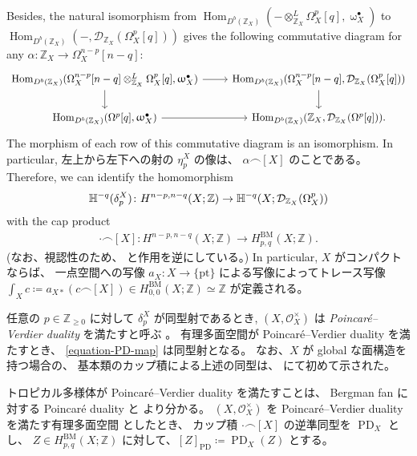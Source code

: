 \documentclass[a4paper,dvipdfmx,reqno,12pt]{amsart}
\theoremstyle{definition}
\newcommand{\deq}{\coloneqq}
\newcommand{\opn}[1]{\operatorname{#1}}
\newcommand{\PD}[1]{[#1]_{\mathrm{PD}}}
\numberwithin{equation}{section}
\begin{document}
Besides, the natural isomorphism from
$\opn{Hom}_{D^{b}(\mathbb{Z}_X)}(- 
\otimes^{L}_{\mathbb{Z}_X} \Omega_X^{p}[q],
\upomega_X^{\bullet})$ to 
$\opn{Hom}_{D^{b}(\mathbb{Z}_X)}(-,
\mathcal{D}_{\mathbb{Z}_X}(\Omega_X^{p}[q]))$
gives the following commutative diagram
for any $\alpha \colon \mathbb{Z}_X\to \Omega_X^{n-p}[n-q]$:
\[\begin{tikzcd}
{\opn{Hom}_{D^{b}(\mathbb{Z}_X)}(\Omega_X^{n-p}[n-q]
\otimes^{L}_{\mathbb{Z}_X} \Omega_X^{p}[q]
,\upomega_X^{\bullet})} & 
{\opn{Hom}_{D^{b}(\mathbb{Z}_X)}
(\Omega_X^{n-p}[n-q],\mathcal{D}_{\mathbb{Z}_X}(\Omega_X^{p}[q]))} \\
{\opn{Hom}_{D^{b}(\mathbb{Z}_X)}(\Omega^{p}[q],
\upomega_X^{\bullet})} & {\opn{Hom}_{D^{b}(\mathbb{Z}_X)}(\mathbb{Z}_X,\mathcal{D}_{\mathbb{Z}_X}(\Omega^{p}[q]))}.
	\arrow[from=1-2, to=2-2]
	\arrow[from=2-1, to=2-2]
	\arrow[from=1-1, to=1-2]
	\arrow[from=1-1, to=2-1]
\end{tikzcd}\]
The morphism of each row of
this commutative diagram is an isomorphism.
In particular,
左上から左下への射の $\eta^X_{p}$ の像は、
$\alpha\frown [X]$ のことである。
Therefore, we can identify
the homomorphism
\begin{align}
\mathbb{H}^{-q}(\delta_p^{X})
\colon H^{n-p,n-q}(X;\mathbb{Z})
\to \mathbb{H}^{-q}(X;\mathcal{D}_{\mathbb{Z}_X}
(\Omega_X^{p})) \notag
\end{align}
with the cap product
\cite[]{MR4637248}
\begin{align}
\label{equation-PD-map}
\cdot \frown [X]
\colon H^{n-p,n-q}(X;\mathbb{Z})
\to
H^{\mathrm{BM}}_{p,q}(X;\mathbb{Z}).
\end{align}
(なお、視認性のため、\cite[]{MR4637248}
と作用を逆にしている。)
In particular, $X$ がコンパクトならば、
一点空間への写像
$a_X\colon X\to \{\mathrm{pt}\}$
による写像によってトレース写像
$\int_X c\deq a_{X*}(c\frown [X])\in 
H_{0,0}^{\mathrm{BM}}(X;\mathbb{Z})\simeq \mathbb{Z}$
が定義される。

任意の $p\in \mathbb{Z}_{\geq 0}$ に対して
$\delta_{p}^{X}$ が同型射であるとき,
$(X,\mathcal{O}_X^{\times})$ は
\emph{Poincar\'e--Verdier duality}
を満たすと呼ぶ \cite[Definition 6.4]{MR4637248}。
有理多面空間が Poincar\'e--Verdier duality を満たすとき、
\cref{equation-PD-map} は同型射となる。
なお、$X$ が global な面構造を持つ場合の、
基本類のカップ積による上述の同型は、
\cite[Theorem 5.3]{MR3894860} にて初めて示された。


トロピカル多様体が
Poincar\'e--Verdier duality を満たすことは、
Bergman fan に対する Poincar\'e duality
\cite[Proposition 5.5]{MR3894860} と
\cite[Theorem 6.7]{MR4637248}
より分かる。
$(X,\mathcal{O}_X^{\times})$ を
Poincar\'e--Verdier duality を満たす有理多面空間
としたとき、
カップ積
$\cdot \frown [X]$
の逆準同型を $\opn{PD}_X$ とし、
$Z\in H^{\mathrm{BM}}_{p,q}(X;\mathbb{Z})$
に対して、$\PD{Z}\deq \opn{PD}_X(Z)$ とする。
\end{document}
